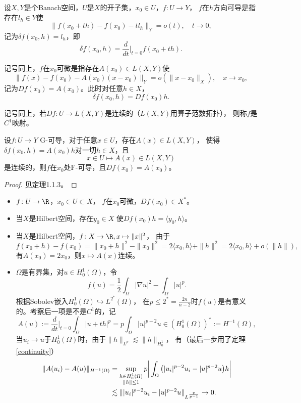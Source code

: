 \begin{definition}
    设$X,Y$是个Banach空间，$U$是$X$的开子集，$x_0\in U$，$f\colon U\to Y$，
    $f$在$h$方向可导是指存在$l_h\in Y$使
    \[\|f(x_0+th)-f(x_0)-tl_h\|_Y=o(t),\quad t\to0,\]
    记为$\delta f(x_0,h)=l_h$，即
    \[\delta f(x_0,h)=\frac{d}{dt}\bigg|_{t=0}f(x_0+th).\]
\end{definition}
\begin{definition}[Fréchet导数，可微]
    记号同上，$f$在$x_0$可微是指存在$A(x_0)\in L(X,Y)$使
    \[\|f(x)-f(x_0)-A(x_0)(x-x_0)\|_Y=o(\|x-x_0\|_X),\quad x\to x_0,\]
    记为$Df(x_0)=A(x_0)$。此时对任意$h\in X$，
    \[\delta f(x_0,h)=Df(x_0)h.\]
\end{definition}
\begin{definition}
    记号同上，若$Df\colon U\to L(X,Y)$是连续的（$L(X,Y)$用算子范数拓扑），
    则称$f$是$C^1$映射。
\end{definition}
\begin{theorem}
    设$f\colon U\to Y$ $\text{G}$-可导，对于任意$x\in U$，存在$A(x)\in L(X,Y)$，
    使得$\delta f(x_0,h)=A(x_0)h$对一切$h\in X$，且
    \[x\in U\mapsto A(x)\in L(X,Y)\]
    是连续的，则$f$在$x_0$处$\text{F}$-可导，且$Df(x_0)=A(x_0)$。
\end{theorem}
\begin{proof}
    见\cite{Zhang}定理1.1.3。
\end{proof}
\begin{example}
    \begin{itemize}
        \item $f\colon U\to\R$，$x_0\in U\subset X$，
        $f$在$x_0$可微，$Df(x_0)\in X^*$。
        \item 当$X$是Hilbert空间，存在$y_0\in X$
        使$Df(x_0)h=\langle y_0,h \rangle$。
        \item 当$X$是Hilbert空间，$f\colon X\to\R,x\mapsto\|x\|^2$，
        由于\[f(x_0+h)-f(x_0)=\|x_0+h\|^2-\|x_0\|^2
        =2\langle x_0,h \rangle+\|h\|^2=2\langle x_0,h \rangle+o(\|h\|),\]
        有$A(x_0)=2x_0$，则$x \mapsto A(x)$连续。
        \item $\Omega$是有界集，对$u\in H_0^1(\Omega)$，令
        \[f(u)=\frac12 \int_\Omega |\nabla u|^2-\int_\Omega |u|^p.\]
        根据Sobolev嵌入$H_0^1(\Omega)\hookrightarrow L^{2^*}(\Omega)$，
        在$p\le2^*=\frac{2n}{n-2}$时$f(u)$是有意义的。考察后一项是不是$C^1$的，记
        \[A(u):=\frac{d}{dt}\bigg|_{t=0}\int_\Omega |u+th|^p
        =p\int_\Omega |u|^{p-2}u\in(H_0^1(\Omega))^*:=H^{-1}(\Omega),\]
        当$u_i\to u$于$H_0^1(\Omega)$时，由于$\|h\|_{L^p}\lesssim\|h\|_{H_0^1}$，
        有（最后一步用了定理\ref{continuity}）
        \begin{align*}
            \|A(u_i)-A(u)\|_{H^{-1}(\Omega)}
            &=\sup_{\begin{subarray}{c}h\in H_0^1(\Omega)\\
                \|h\|\le1\end{subarray}}
            p\bigg|\int_\Omega \big(|u_i|^{p-2}u_i-|u|^{p-2}u\big)h\bigg|\\
            &\lesssim\||u_i|^{p-2}u_i-|u|^{p-2}u\|_{L^\frac{p}{p-1}}\to0.
        \end{align*}
    \end{itemize}
\end{example}
